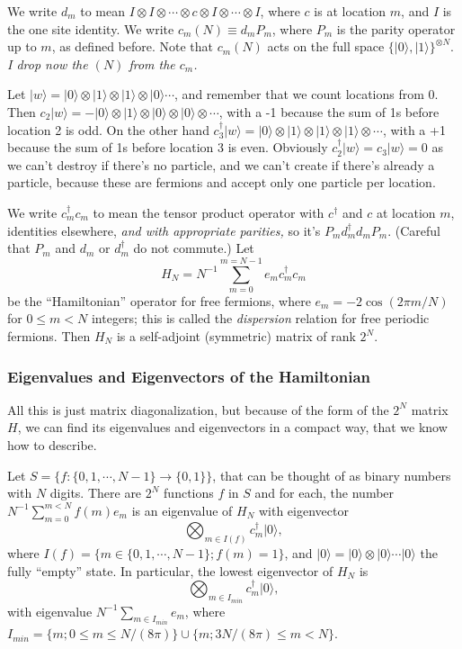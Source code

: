 	We write $d_m$ to mean $I\otimes I\otimes\cdots \otimes c \otimes I \otimes \cdots\otimes I$, where $c$ is at location $m$,
	and $I$ is the one site identity. We write $c_m (N) \equiv d_m P_m$, where $P_m$ is the parity operator up to $m$, as defined before.
	Note that $c_m (N)$ acts on the full space $\{|0\rangle, |1\rangle\}^{\otimes N}$. \emph{I drop now the $(N)$ from the $c_m$.}
	
	\begin{example}
Let $|w\rangle=|0\rangle\otimes|1\rangle\otimes|1\rangle\otimes|0\rangle\cdots$, and remember that we count locations from $0$.
	Then $c_2|w\rangle=-|0\rangle\otimes|1\rangle\otimes|0\rangle\otimes|0\rangle\otimes\cdots$, with a -1 because the sum of 1s before location 2 is odd.
	On the other hand $c^\dagger_3|w\rangle = |0\rangle\otimes|1\rangle\otimes|1\rangle\otimes|1\rangle\otimes\cdots$, with a +1 because
	the sum of 1s before location 3 is even. Obviously  $c_2^\dagger|w\rangle = c_3|w\rangle = 0$ as we can't destroy if there's no particle,
	and we can't create if there's already a particle, because these are fermions and accept only one particle per location.
	\end{example}
	 
	We write $c^\dagger_m c_m$ to mean the tensor product operator with $c^\dagger$ and $c$ at location $m$, 
	identities elsewhere, \emph{and with appropriate parities,} so it's $P_m d^\dagger_m  d_m P_m$. (Careful that $P_m$ and $d_m$ or $d^\dagger_m$ do not commute.)
	Let 
	\begin{equation}
	H_N=N^{-1}\sum_{m=0}^{m=N-1} e_m c^\dagger_m c_m
	\end{equation} be the ``Hamiltonian'' operator for free fermions, where $e_m = -2\cos(2\pi m/N)$ for $0\le m < N$ integers;
	this is called the \emph{dispersion} relation for free periodic fermions.
	Then $H_N$ is a self-adjoint (symmetric) matrix of rank $2^N$.
	
	\subsubsection{Eigenvalues and Eigenvectors of the Hamiltonian}
	All this is just matrix diagonalization, but because of the form of the $2^N$ matrix $H$, we can find its
	eigenvalues and eigenvectors in a compact way, that we know how to describe.
	
	Let $S = \{ f: \{0, 1, \cdots, N - 1\} \rightarrow \{0, 1\}\}$, that can be thought of as binary numbers with $N$ digits.
	There are $2^N$ functions $f$ in $S$ and for each, the number
	$N^{-1}\sum_{m=0}^{m < N} f(m) e_m$ is an eigenvalue of $H_N$ with eigenvector
	\[
	\bigotimes_{m\in I(f)}c^\dagger_{m}|0\rangle,
	\]
	 where $I(f) = \{m\in\{0, 1, \cdots, N - 1\}; f(m) = 1\}$,  
	and $|0\rangle = |0\rangle\otimes|0\rangle\cdots|0\rangle$ the fully ``empty'' state.
 	 In particular, the lowest eigenvector of $H_N$ is
 	 \[
 	 \bigotimes_{m\in I_{min}}c^\dagger_{m}|0\rangle,
 	 \]
 	 with eigenvalue $N^{-1}\sum_{m \in I_{min}} e_m$, where $I_{min} = \{m; 0\le m \le N/(8\pi)\}\cup\{m; 3N/(8\pi)\le m < N\}$.
 	
